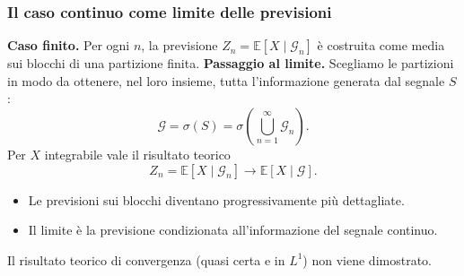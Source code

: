 \documentclass[handout]{beamer}%
\providecommand{\E}{\mathbb{E}}
\providecommand{\G}{\mathcal{G}}
\providecommand{\1}{\mathbf{1}}
\providecommand{\QTR}[2]{\csname #1\endcsname{#2}}
\begin{document}
\begin{frame}%
\frametitle{Il caso continuo come limite delle previsioni}
%


\textbf{Caso finito.} Per ogni $n$, la previsione $Z_{n}=\E[X\mid\G_n]$ \`{e}
costruita come media sui blocchi di una partizione finita. \medskip
\textbf{Passaggio al limite.} Scegliamo le partizioni in modo da ottenere, nel
loro insieme, tutta l'informazione generata dal segnale $S$:
\[
\G=\sigma(S) =\sigma\!\left( \bigcup_{n=1}^{\infty}\G_{n}\right) .
\]
Per $X$ integrabile vale il risultato teorico
\[
\boxed{Z_n=\E[X\mid\G_n]\longrightarrow\E[X\mid\G].}
\]


\begin{itemize}
\item Le previsioni sui blocchi diventano progressivamente pi\`{u} dettagliate.

\item Il limite \`{e} la previsione condizionata all'informazione del segnale continuo.
\end{itemize}

{\scriptsize \textcolor{light-blue}{Il risultato teorico di convergenza (quasi certa e in $L^1$) non viene dimostrato.}}%
%

\end{frame}%


\end{document}

